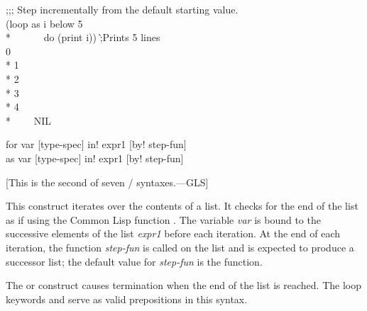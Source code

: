 \begin{defloop}
\begin{lisp}
;;; Step incrementally from the default starting value. \\[3pt]
(loop as i below 5 \\*
~~~~~~do (print i)) \`;\textrm{Prints 5 lines} \\
0 \\*
1 \\*
2 \\*
3 \\*
4 \\*
~~~\EV~NIL
\end{lisp}
\end{defloop}

\begin{defloop}
for var [type-spec] \!in! expr1 [\!by! step-fun] \\
as var [type-spec] \!in! expr1 [\!by! step-fun]

[This is the second of seven / syntaxes.---GLS]

This construct iterates over the contents of a list.  It checks for 
the end of the list as if using the Common Lisp function .  
The variable \emph{var\/} is bound to the successive elements  of 
the list \emph{expr1\/} before each
iteration.  At the end of each iteration, the function \emph{step-fun\/}
is called on the list and is expected to produce a successor list;
the default value for \emph{step-fun\/} is the  function.

The  or  construct causes termination when the
end of the list is reached.
The loop keywords  and  serve as valid prepositions in
this syntax.


\end{defloop}
